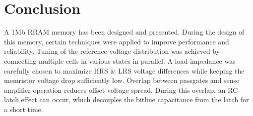 \documentclass[journal]{IEEEtran}
\begin{document}
%





\section{Conclusion}
A 1Mb RRAM memory has been designed and presented. During the design of this memory, certain techniques were applied to improve performance and reliability. Tuning of the reference voltage distribution was achieved by connecting multiple cells in various states in parallel. A load impedance was carefully chosen to maximize HRS \& LRS voltage differences while keeping the memristor voltage drop sufficiently low. Overlap between passgates and sense amplifier operation reduces offset voltage spread. During this overlap, an RC-latch effect can occur, which decouples the bitline capacitance from the latch for a short time.


\end{document}
